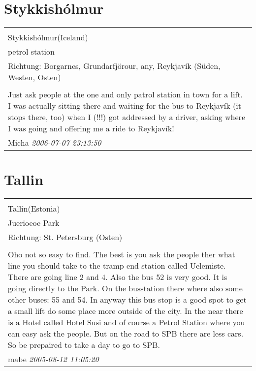 \documentclass[a4paper,12pt]{article}
\begin{document}
\section{Stykkishólmur}
\begin{tabular}{|p{13cm}|}
\hline\\
Stykkishólmur(Iceland)\\
petrol station\\
Richtung: Borgarnes, Grundarfjörour, any, Reykjavík (Süden, Westen, Osten) \\
\hline\\
Just ask people at the one and only patrol station in town for a lift. I was actually sitting there and waiting for the bus to Reykjavík (it stops there, too) when I (!!!) got addressed by a driver, asking where I was going and offering me a ride to Reykjavík! \\
Micha \textit{ 2006-07-07 23:13:50 }\\\hline
\end{tabular}


\section{Tallin}
\begin{tabular}{|p{13cm}|}
\hline\\
Tallin(Estonia)\\
Juerioeoe Park\\
Richtung: St. Petersburg (Osten) \\
\hline\\
Oho not so easy to find. The best is you ask the people ther what line you should take to the tramp end station called Uelemiste. There are going line 2 and 4. Also the bus 52 is very good. It is going directly to the Park. On the busstation there where also some other buses: 55 and 54. In anyway this bus stop is a good spot to get a small lift do some place more outside of the city. In the near there is a Hotel called Hotel Susi and of course a Petrol Station where you can easy ask the people. But on the road to SPB there are less cars. So be prepaired to take a day to go to SPB. \\
mabe \textit{ 2005-08-12 11:05:20 }\\\hline
\end{tabular}
\end{document}
